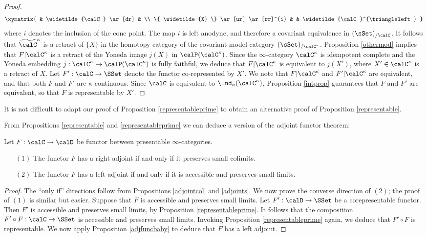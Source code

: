 \begin{proof}
$$ \xymatrix{ & \widetilde{\calC} \ar[dr] & \\
\{ \widetilde{X} \} \ar[ur] \ar[rr]^{i} & & \widetilde{\calC}^{\triangleleft} }$$
where $i$ denotes the inclusion of the cone point. The map $i$ is left anodyne, and therefore
a covariant equivalence in $(\sSet)_{/\calC}$. 
It follows that $\widetilde{\calC}^{\kappa}$ is a retract of $\{ X \}$ in
the homotopy category of the covariant model category $(\sSet)_{/\calC^{\kappa}}$. Proposition \ref{othermod} implies that $F | \calC^{\kappa}$ is a retract of the Yoneda image
$j(X)$ in $\calP(\calC^{\kappa})$. Since the $\infty$-category $\calC^{\kappa}$
is idempotent complete and the Yoneda embedding $j: \calC^{\kappa} \rightarrow
\calP(\calC^{\kappa})$ is fully faithful, we deduce that $F| \calC^{\kappa}$ is
equivalent to $j(X')$, where $X' \in \calC^{\kappa}$ is a retract of $X$. Let $F': \calC \rightarrow \SSet$ denote the functor co-represented by $X'$. We note that $F|\calC^{\kappa}$ and
$F'| \calC^{\kappa}$ are equivalent, and that both $F$ and $F'$ are $\kappa$-continuous.
Since $\calC$ is equivalent to $\Ind_{\kappa}(\calC^{\kappa})$, Proposition \ref{intprop} guarantees that $F$ and $F'$ are equivalent, so that $F$ is representable by $X'$.
\end{proof}

\begin{remark}
It is not difficult to adapt our proof of Proposition \ref{representableprime} to obtain an alternative proof of Proposition \ref{representable}.
\end{remark}

From Propositions \ref{representable} and \ref{representableprime} we can deduce a version of the
adjoint functor theorem:

\begin{corollary}\label{adjointfunctor}
Let $F: \calC \rightarrow \calD$ be functor between presentable $\infty$-categories.
\begin{itemize}
\item[$(1)$] The functor $F$ has a right adjoint if and only if it preserves small colimits.
\item[$(2)$] The functor $F$ has a left adjoint if and only if it is accessible and preserves small limits.
\end{itemize}
\end{corollary}

\begin{proof}
The ``only if'' directions follow from Propositions \ref{adjointcol} and \ref{adjoints}. We now prove the converse direction of $(2)$; the proof of $(1)$ is similar but easier. Suppose that
$F$ is accessible and preserves small limits. Let $F': \calD \rightarrow \SSet$ be a corepresentable functor. Then $F'$ is accessible and preserves small limits, by Proposition \ref{representableprime}. It follows that the composition $F' \circ F: \calC \rightarrow \SSet$ is accessible and preserves small limits. Invoking Proposition \ref{representableprime} again, we deduce that $F' \circ F$ is representable. We now apply Proposition \ref{adjfuncbaby} to deduce that $F$ has a left adjoint.
\end{proof}

